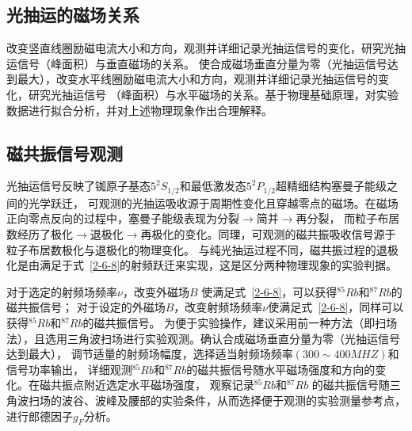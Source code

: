 \documentclass[11pt,a4paper]{article}
\begin{document}
\begin{spacing}{1.3}
\begin{CJK*}{UTF8}{gbsn}
\subsection{光抽运的磁场关系}
改变竖直线圈励磁电流大小和方向，观测并详细记录光抽运信号的变化，研究光抽运信号（峰面积）与垂直磁场的关系。
使合成磁场垂直分量为零（光抽运信号达到最大），改变水平线圈励磁电流大小和方向，观测并详细记录光抽运信号的变化，研究光抽运信号
（峰面积）与水平磁场的关系。基于物理基础原理，对实验数据进行拟合分析，并对上述物理现象作出合理解释。

\subsection{磁共振信号观测}
光抽运信号反映了铷原子基态$5^2S_{1/2}$和最低激发态$5^2P_{1/2}$超精细结构塞曼子能级之间的光学跃迁，
可观测的光抽运吸收源于周期性变化且穿越零点的磁场。在磁场正向零点反向的过程中，塞曼子能级表现为分裂$\to$简并$\to$再分裂，
而粒子布居数经历了极化$\to$退极化$\to$再极化的变化。同理，可观测的磁共振吸收信号源于粒子布居数极化与退极化的物理变化。
与纯光抽运过程不同，磁共振过程的退极化是由满足于式~\eqref{2-6-8}的射频跃迁来实现，这是区分两种物理现象的实验判据。\par
对于选定的射频场频率$\nu$，改变外磁场$B$ 使满足式~\eqref{2-6-8}，可以获得$^{85}Rb$和$^{87}Rb$的磁共振信号；
对于设定的外磁场$B$，改变射频场频率$\nu$使满足式~\eqref{2-6-8}，同样可以获得$^{85}Rb$和$^{87}Rb$的磁共振信号。
为便于实验操作，建议采用前一种方法（即扫场法），且选用三角波扫场进行实验观测。确认合成磁场垂直分量为零（光抽运信号达到最大），
调节适量的射频场幅度，选择适当射频场频率$(300\sim 400MHZ)$和信号功率输出，
详细观测$^{85}Rb$和$^{87}Rb$的磁共振信号随水平磁场强度和方向的变化。在磁共振点附近选定水平磁场强度，
观察记录$^{85}Rb$和$^{87}Rb$ 的磁共振信号随三角波扫场的波谷、波峰及腰部的实验条件，从而选择便于观测的实验测量参考点，
进行郎德因子$g_F$分析。


\end{CJK*}
\end{spacing}
\end{document}
